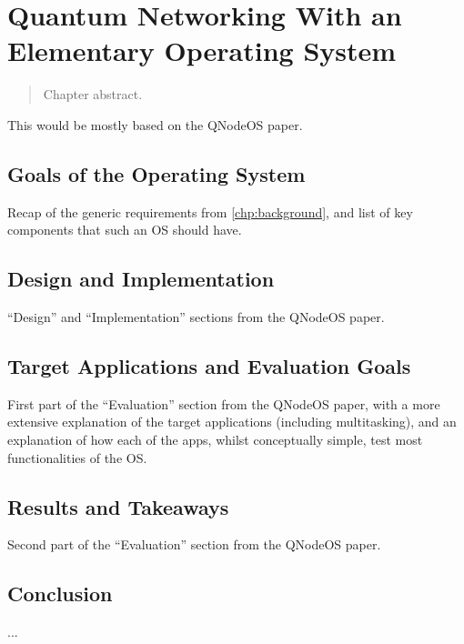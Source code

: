 \chapter{Quantum Networking With an Elementary Operating System}
\label{chp:qnodeos}

\begin{refsection}

\begin{abstract}
Chapter abstract.
\end{abstract}


\newpage


\noindent
This would be mostly based on the QNodeOS paper.

\section{Goals of the Operating System}

Recap of the generic requirements from \cref{chp:background}, and list of key components that such
an OS should have.

\section{Design and Implementation}

``Design'' and ``Implementation'' sections from the QNodeOS paper.

\section{Target Applications and Evaluation Goals}

First part of the ``Evaluation'' section from the QNodeOS paper, with a more extensive explanation
of the target applications (including multitasking), and an explanation of how each of the apps,
whilst conceptually simple, test most functionalities of the OS.

\section{Results and Takeaways}

Second part of the ``Evaluation'' section from the QNodeOS paper.

\section{Conclusion}

...

\printbibliography[heading=subbibintoc,title={References}]

\end{refsection}
